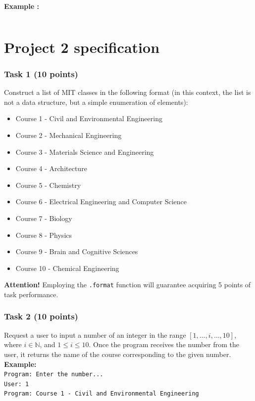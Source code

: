 \documentclass[12pt]{book}
\newtheorem{Example}{Example}[chapter]
\renewenvironment{Example}{\begin{trivlist}\item\relax
\textbf{Example \thesection: }}{\end{trivlist}}
\begin{document}
\begin{Example}
\begin{lstlisting}
\end{lstlisting}
\end{Example}
\newpage
\section{Project 2 specification}


\subsubsection{Task 1 (10 points)}
Construct a list of MIT classes in the following format (in this context, the list is not a data structure, but a simple enumeration of elements):

\begin{itemize}
\item Course 1 - Civil and Environmental Engineering
\item Course 2 - Mechanical Engineering
\item Course 3 - Materials Science and Engineering
\item Course 4 - Architecture
\item Course 5 - Chemistry
\item Course 6 - Electrical Engineering and Computer Science
\item Course 7 - Biology
\item Course 8 - Physics
\item Course 9 - Brain and Cognitive Sciences
\item Course 10 - Chemical Engineering
\end{itemize}

\textbf{Attention!} Employing the \texttt{.format} function will guarantee acquiring 5 points of task performance.

\subsubsection{Task 2 (10 points)}
Request a user to input a number of an integer in the range $[1, \dots, i, \dots, 10]$, where $i \in \mathbb{N}$, and $1 \leq i \leq 10$. Once the program receives the number from the user, it returns the name of the course corresponding to the given number. \\
\textbf{Example:} \\
\texttt{Program: Enter the number...} \\
\texttt{User:    1} \\
\texttt{Program: Course 1 - Civil and Environmental Engineering}
\end{document}
